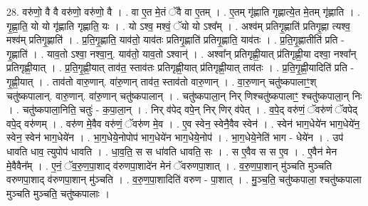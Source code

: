 \documentclass[17pt]{extarticle}
\begin{document}
28. वरु॑णो॒ वै वै वरु॑णो॒ वरु॑णो॒ वै । . वा ए॒त मे॒तं ॅवै वा ए॒तम् । . ए॒तम् गृ॑ह्णाति गृह्णात्ये॒त मे॒तम् गृ॑ह्णाति । . गृ॒ह्णा॒ति॒ यो यो गृ॑ह्णाति गृह्णाति॒ यः । . यो ऽश्व॒ मश्वं॒ ॅयो यो ऽश्व᳚म् । . अश्व॑म् प्रतिगृ॒ह्णाति॑ प्रतिगृ॒ह्णा त्यश्व॒ मश्व॑म् प्रतिगृ॒ह्णाति॑ । . प्र॒ति॒गृ॒ह्णाति॒ याव॑तो॒ याव॑तः प्रतिगृ॒ह्णाति॑ प्रतिगृ॒ह्णाति॒ याव॑तः । . प्र॒ति॒गृ॒ह्णातीति॑ प्रति - गृ॒ह्णाति॑ । . याव॒तो ऽश्वा॒ नश्वा॒न्॒. याव॑तो॒ याव॒तो ऽश्वान्॑ । . अश्वा᳚न् प्रतिगृह्णी॒यात् प्र॑तिगृह्णी॒या दश्वा॒ नश्वा᳚न् प्रतिगृह्णी॒यात् । . प्र॒ति॒गृ॒ह्णी॒यात् ताव॑त॒ स्ताव॑तः प्रतिगृह्णी॒यात् प्र॑तिगृह्णी॒यात् ताव॑तः । . प्र॒ति॒गृ॒ह्णी॒यादिति॑ प्रति - गृ॒ह्णी॒यात् । . ताव॑तो वारु॒णान्. वा॑रु॒णान् ताव॑त॒ स्ताव॑तो वारु॒णान् । . वा॒रु॒णान् चतु॑ष्कपालाꣳ॒॒श् चतु॑ष्कपालान्. वारु॒णान्. वा॑रु॒णान् चतु॑ष्कपालान् । . चतु॑ष्कपाला॒न् निर् णिश्चतु॑ष्कपालाꣳ॒॒ श्चतु॑ष्कपाला॒न् निः । . चतु॑ष्कपाला॒निति॒ चतुः॑ - क॒पा॒ला॒न् । . निर् व॑पेद् वपे॒न् निर् णिर् व॑पेत् । . व॒पे॒द् वरु॑णं॒ ॅवरु॑णं ॅवपेद् वपे॒द् वरु॑णम् । . वरु॑ण मे॒वैव वरु॑णं॒ ॅवरु॑ण मे॒व । . ए॒व स्वेन॒ स्वेनै॒वैव स्वेन॑ । . स्वेन॑ भाग॒धेये॑न भाग॒धेये॑न॒ स्वेन॒ स्वेन॑ भाग॒धेये॑न । . भा॒ग॒धेये॒नोपोप॑ भाग॒धेये॑न भाग॒धेये॒नोप॑ । . भा॒ग॒धेये॒नेति॑ भाग - धेये॑न । . उप॑ धावति धाव॒ त्युपोप॑ धावति । . धा॒व॒ति॒ स स धा॑वति धावति॒ सः । . स ए॒वैव स स ए॒व । . ए॒वैन॑ मेन मे॒वैवैन᳚म् । . ए॒नं॒ ॅव॒रु॒ण॒पा॒शाद् व॑रुणपा॒शादे॑न मेनं ॅवरुणपा॒शात् । . व॒रु॒ण॒पा॒शान् मु॑ञ्चति मुञ्चति वरुणपा॒शाद् व॑रुणपा॒शान् मु॑ञ्चति । . व॒रु॒ण॒पा॒शादिति॑ वरुण - पा॒शात् । . मु॒ञ्च॒ति॒ चतु॑ष्कपाला॒ श्चतु॑ष्कपाला मुञ्चति मुञ्चति॒ चतु॑ष्कपालाः । \newline
\end{document}

